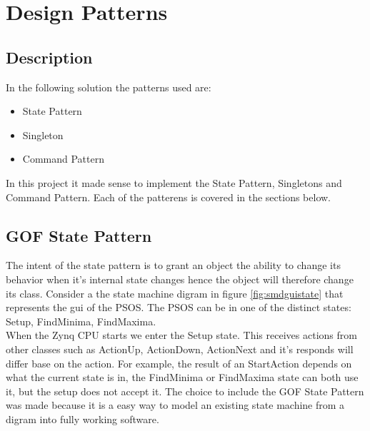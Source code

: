 \section{Design Patterns} \label{designpatterns}

\subsection{Description}

\noindent{}

In the following solution the patterns   used are:
\begin{itemize}
	\item State Pattern
	\item Singleton
	\item Command Pattern
\end{itemize}

In this project it made sense to implement the State Pattern, Singletons and Command Pattern. Each of the patterens is covered in the sections below.

\subsection{GOF State Pattern}\label{dp:state}
The intent of the state pattern is to grant an object the ability to change its behavior when it's internal state changes hence the object will therefore change its class. Consider a the state machine digram in figure \ref{fig:smdguistate} that represents the gui of the PSOS. The PSOS can be in one of the distinct states: Setup, FindMinima, FindMaxima. \\

When the Zynq CPU starts we enter the Setup state. This receives actions from other classes such as ActionUp, ActionDown, ActionNext and it's responds will differ base on the action. For example, the result of an StartAction depends on what the current state is in, the FindMinima or FindMaxima state can both use it, but the setup does not accept it. The choice to include the GOF State Pattern was made because it is a easy way to model an existing state machine from a digram into fully working software. \\

